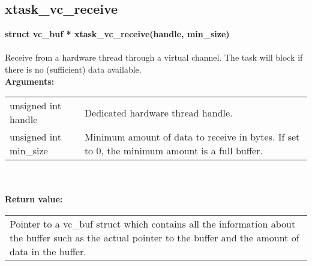 \begin{samepage}
\subsection{xtask\_vc\_receive}
\noindent
\textbf{struct vc\_buf * xtask\_vc\_receive(handle, min\_size)}\\\\
Receive from a hardware thread through a virtual channel.
The task will block if there is no (sufficient) data available.\\

\noindent
\textbf{Arguments:}\\
\indent\begin{tabular}{ p{4.5cm}  p{9cm} }
unsigned int handle      & Dedicated hardware thread handle. \\ 
unsigned int min\_size   & Minimum amount of data to receive in
                           bytes. If set to 0, the minimum amount
                           is a full buffer.           
\end{tabular}\\\\

\noindent
\textbf{Return value:}\\
\indent\begin{tabular}{  p{13.5cm} }
Pointer to a vc\_buf struct which contains all the
information about the buffer such as the actual pointer to
the buffer and the amount of data in the buffer.
\end{tabular}
\end{samepage}

